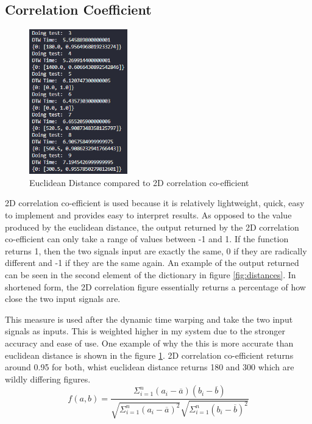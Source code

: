 \documentclass[10pt,a4paper]{report}
\begin{document}
\subsection{Correlation Coefficient}

\begin{figure}
	\begin{center}
		\includegraphics[width=0.38\textwidth]{EucVs2D}
	\end{center}
	\caption{Euclidean Distance compared to 2D correlation co-efficient}
	\label{fig:VCompare}
\end{figure}

2D correlation co-efficient is used because it is relatively lightweight, quick, easy to implement and provides easy to interpret results. As opposed to the value produced by the euclidean distance, the output returned by the 2D correlation co-efficient can only take a range of values between -1 and 1. If the function returns 1, then the two signals input are exactly the same, 0 if they are radically different and -1 if they are the same again. An example of the output returned can be seen in the second element of the dictionary in figure \ref{fig:distances}. In shortened form, the 2D correlation figure essentially returns a percentage of how close the two input signals are.

This measure is used after the dynamic time warping and take the two input signals as inputs. This is weighted higher in my system due to the stronger accuracy and ease of use. One example of why the this is more accurate than euclidean distance is shown in the figure \ref{fig:VCompare}. 2D correlation co-efficient returns around 0.95 for both, whist euclidean distance returns 180 and 300 which are wildly differing figures.
\begin{equation}
	f(a,b) = \frac{\Sigma^n_{i=1}(a_i-\overline{a})(b_i - \overline{b})}{\sqrt{\Sigma^n_{i=1} (a_i-\overline{a})^2}\sqrt{\Sigma^n_{i=1}(b_i-\overline{b})^2}}
	\label{fig:corrco}
\end{equation}
\end{document}
